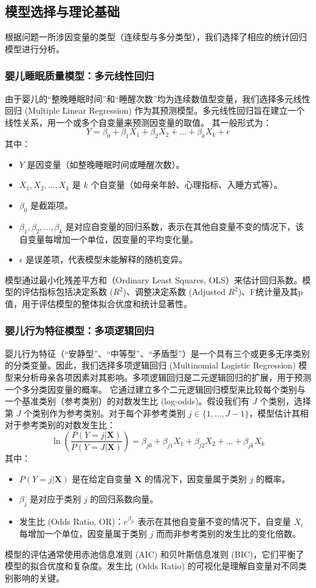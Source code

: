 \documentclass[withoutpreface,bwprint]{cumcmthesis}
\begin{document}
\subsection{模型选择与理论基础}
根据问题一所涉因变量的类型（连续型与多分类型），我们选择了相应的统计回归模型进行分析。

\subsubsection{婴儿睡眠质量模型：多元线性回归}
由于婴儿的“整晚睡眠时间”和“睡醒次数”均为连续数值型变量，我们选择多元线性回归 (Multiple Linear Regression) 作为其预测模型。多元线性回归旨在建立一个线性关系，用一个或多个自变量来预测因变量的取值。
其一般形式为：
$$ Y = \beta_0 + \beta_1 X_1 + \beta_2 X_2 + \dots + \beta_k X_k + \epsilon $$
其中：
\begin{itemize}
    \item $Y$ 是因变量（如整晚睡眠时间或睡醒次数）。
    \item $X_1, X_2, \dots, X_k$ 是 $k$ 个自变量（如母亲年龄、心理指标、入睡方式等）。
    \item $\beta_0$ 是截距项。
    \item $\beta_1, \beta_2, \dots, \beta_k$ 是对应自变量的回归系数，表示在其他自变量不变的情况下，该自变量每增加一个单位，因变量的平均变化量。
    \item $\epsilon$ 是误差项，代表模型未能解释的随机变异。
\end{itemize}
模型通过最小化残差平方和（Ordinary Least Squares, OLS）来估计回归系数。模型的评估指标包括决定系数 ($R^2$)、调整决定系数 (Adjusted $R^2$)、F统计量及其p值，用于评估模型的整体拟合优度和统计显著性。

\subsubsection{婴儿行为特征模型：多项逻辑回归}
婴儿行为特征（“安静型”、“中等型”、“矛盾型”）是一个具有三个或更多无序类别的分类变量。因此，我们选择多项逻辑回归 (Multinomial Logistic Regression) 模型来分析母亲各项因素对其影响。多项逻辑回归是二元逻辑回归的扩展，用于预测一个多分类因变量的概率。
它通过建立多个二元逻辑回归模型来比较每个类别与一个基准类别（参考类别）的对数发生比 (log-odds)。假设我们有 $J$ 个类别，选择第 $J$ 个类别作为参考类别。对于每个非参考类别 $j \in \{1, \dots, J-1\}$，模型估计其相对于参考类别的对数发生比：
$$ \ln\left(\frac{P(Y=j | \mathbf{X})}{P(Y=J | \mathbf{X})}\right) = \beta_{j0} + \beta_{j1} X_1 + \beta_{j2} X_2 + \dots + \beta_{jk} X_k $$
其中：
\begin{itemize}
    \item $P(Y=j | \mathbf{X})$ 是在给定自变量 $\mathbf{X}$ 的情况下，因变量属于类别 $j$ 的概率。
    \item $\beta_{j}$ 是对应于类别 $j$ 的回归系数向量。
\item 发生比 (Odds Ratio, OR)：$e^{\beta_{ji}}$ 表示在其他自变量不变的情况下，自变量 $X_i$ 每增加一个单位，因变量属于类别 $j$ 而而非参考类别的发生比的变化倍数。
\end{itemize}
模型的评估通常使用赤池信息准则 (AIC) 和贝叶斯信息准则 (BIC)，它们平衡了模型的拟合优度和复杂度。发生比 (Odds Ratio) 的可视化是理解自变量对不同类别影响的关键。
\end{document}
